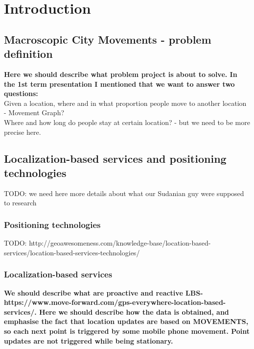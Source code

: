 \chapter{Introduction}
\label{cha:introduction}

\section{Macroscopic City Movements - problem definition}
\label{cha:introduction_probdef}

\textbf{Here we should describe what problem project is about to solve. In the 1st term presentation I mentioned that we want to answer two questions:
}\\
 
Given a location, where and in what proportion people move to another location - Movement Graph? 
\\
Where and how long do people stay at certain location? - but we need to be more precise here.

\section{Localization-based services and positioning technologies}
\label{cha:introduction_methodo}

TODO: we need here more details about what our Sudanian guy were supposed to research
\subsection{Positioning technologies}

TODO: http://geoawesomeness.com/knowledge-base/location-based-services/location-based-services-technologies/

\subsection{Localization-based services}

\textbf{We should describe what are proactive and reactive LBS- https://www.move-forward.com/gps-everywhere-location-based-services/. Here we should describe how the data is obtained, and emphasise the fact that location updates are based on MOVEMENTS, so each next point is triggered by some mobile phone movement. Point updates are not triggered while being stationary. }

